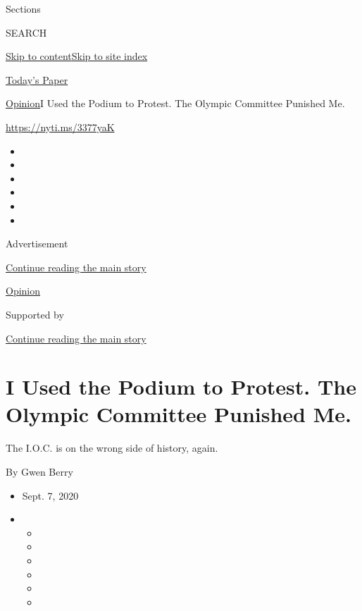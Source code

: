 Sections

SEARCH

\protect\hyperlink{site-content}{Skip to
content}\protect\hyperlink{site-index}{Skip to site index}

\href{https://myaccount.nytimes3xbfgragh.onion/auth/login?response_type=cookie\&client_id=vi}{}

\href{https://www.nytimes3xbfgragh.onion/section/todayspaper}{Today's
Paper}

\href{/section/opinion}{Opinion}\textbar{}I Used the Podium to Protest.
The Olympic Committee Punished Me.

\url{https://nyti.ms/3377yaK}

\begin{itemize}
\item
\item
\item
\item
\item
\item
\end{itemize}

Advertisement

\protect\hyperlink{after-top}{Continue reading the main story}

\href{/section/opinion}{Opinion}

Supported by

\protect\hyperlink{after-sponsor}{Continue reading the main story}

\hypertarget{i-used-the-podium-to-protest-the-olympic-committee-punished-me}{%
\section{I Used the Podium to Protest. The Olympic Committee Punished
Me.}\label{i-used-the-podium-to-protest-the-olympic-committee-punished-me}}

The I.O.C. is on the wrong side of history, again.

By Gwen Berry

\begin{itemize}
\item
  Sept. 7, 2020
\item
  \begin{itemize}
  \item
  \item
  \item
  \item
  \item
  \item
  \end{itemize}
\end{itemize}

